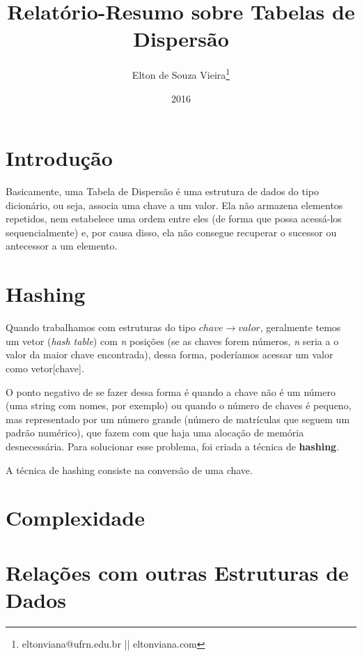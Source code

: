 \documentclass[12pt,openright,oneside,a4paper,english,brazil]{abntex2}
\author{Elton de Souza Vieira\thanks{eltonviana@ufrn.edu.br || eltonviana.com}}
\title{Relatório-Resumo sobre Tabelas de Dispersão}
\date{2016}
\begin{document}
\imprimircapa

\section*{Introdução}
    Basicamente, uma Tabela de Dispersão é uma estrutura de dados do tipo dicionário, ou seja, associa uma chave a um valor. Ela não armazena elementos repetidos, nem estabelece uma ordem entre eles (de forma que possa acessá-los sequencialmente) e, por causa disso, ela não consegue recuperar o sucessor ou antecessor a um elemento.

\section*{Hashing}
    Quando trabalhamos com estruturas do tipo ${chave}\rightarrow{valor}$, geralmente temos um vetor (\textit{hash table}) com \textit{n} posições (se as chaves forem números, \textit{n} seria a o valor da maior chave encontrada), dessa forma, poderíamos acessar um valor como vetor[chave].

    O ponto negativo de se fazer dessa forma é quando a chave não é um número (uma string com nomes, por exemplo) ou quando o número de chaves é pequeno, mas representado por um número grande (número de matrículas que seguem um padrão numérico), que fazem com que haja uma alocação de memória desnecessária. Para solucionar esse problema, foi criada a técnica de \textbf{hashing}.

    A técnica de hashing consiste na conversão de uma chave.

\section*{Complexidade}

\section*{Relações com outras Estruturas de Dados}
\end{document}
